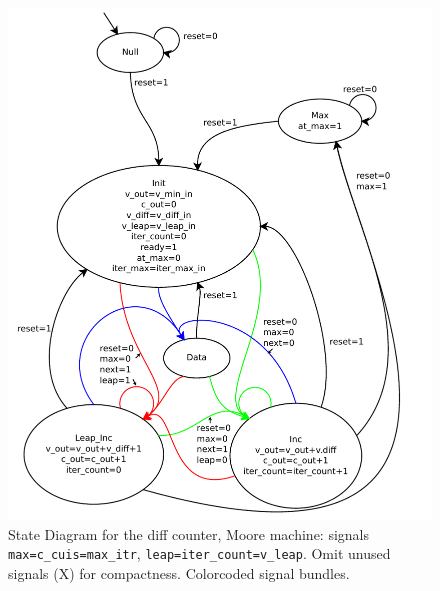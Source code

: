\documentclass{article}
\begin{document}
\begin{figure}[h!]
  \centering
    \includegraphics[width=\textwidth]{state_diagrams/diff_counter.pdf}
  \caption{State Diagram for the diff counter, Moore machine: signals
    \texttt{max=c\_cuis=max\_itr}, \texttt{leap=iter\_count=v\_leap}. Omit
    unused signals (X) for compactness. Colorcoded signal bundles.}
\end{figure}
\end{document}
